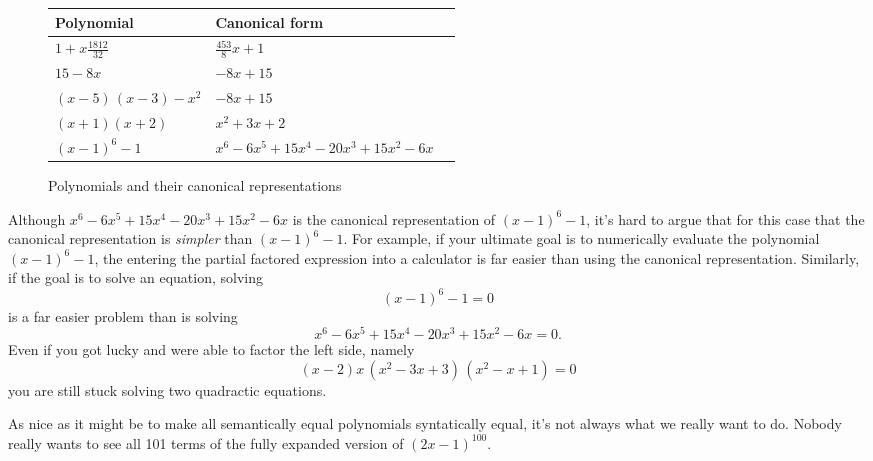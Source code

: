 \documentclass[12pt,fleqn]{article}
\begin{document}
\begin{figure}[h]
\center
\begin{tabular}{|m{5.18cm}|m{7.18cm}|@{}m{0pt}@{}} \hline 
\textbf{Polynomial}  & \textbf{Canonical form} \\[7pt]  \hline
$  1 +  x \frac{1812}{32}$   &  $  \frac{453}{8} x + 1 $ \\[7pt]  \hline 
$ 15 - 8 x$  & $-8 x + 15$ \\[7pt]  \hline 
$\left( x-5\right) \, \left( x-3\right) -{{x}^{2}} $  & $-8 x + 15$  \\[7pt]  \hline 
$   (x+1)(x+2) $ &  $ x^2 + 3 x + 2$  \\[7pt]  \hline 
$   {{\left( x-1\right) }^{6}}-1  $  & ${{x}^{6}}-6 {{x}^{5}}+15 {{x}^{4}}-20 {{x}^{3}}+15 {{x}^{2}}-6 x $ \\[7pt]  \hline
\end{tabular}
\caption{Polynomials and their canonical representations}
\end{figure}
Although ${{x}^{6}}-6 {{x}^{5}}+15 {{x}^{4}}-20 {{x}^{3}}+15 {{x}^{2}}-6 x $ is the canonical representation of ${{\left( x-1\right) }^{6}}-1$, it's
hard to argue that for this case that the canonical representation is \emph{simpler} than ${{\left( x-1\right) }^{6}}-1$. For example, if your ultimate goal is to  numerically evaluate the polynomial  ${{\left( x-1\right) }^{6}}-1$, the entering the partial factored expression into a calculator is far easier
than using the canonical representation.  Similarly, if the goal is to solve an equation, solving
\begin{equation*}
  {{\left( x-1\right) }^{6}}-1 = 0
\end{equation*}
is a far easier problem than is solving
\begin{equation*}
  {{x}^{6}}-6 {{x}^{5}}+15 {{x}^{4}}-20 {{x}^{3}}+15 {{x}^{2}}-6 x  = 0.
\end{equation*}
Even if you got lucky and were able to factor the left side, namely
\begin{equation*}
\left( x-2\right)  x\, \left( {{x}^{2}}-3 x+3\right) \, \left( {{x}^{2}}-x+1\right)  = 0
\end{equation*}
you are still stuck solving two quadractic equations. 


As nice as it might be to make all semantically equal polynomials syntatically equal, it's not always what we really want to do.  Nobody
really wants to see all 101 terms of the fully expanded version of $(2  x-1)^100$.
\end{document}
